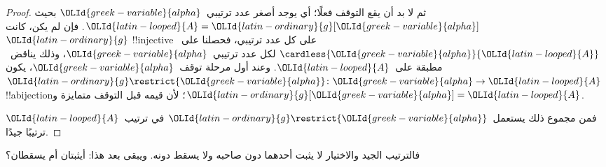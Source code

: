 \documentclass[../../../include/open-logic-section]{subfiles}
\begin{document}
\begin{proof}
ثم لا بد أن يقع التوقف فعلًا؛ أي يوجد أصغر عدد ترتيبي~${\OLId{greek-variable}{alpha}}$ بحيث
${\OLId{latin-looped}{A}} = {\OLId{latin-ordinary}{g}}[{\OLId{greek-variable}{alpha}}]$. فإن لم يكن، كانت~${\OLId{latin-ordinary}{g}}$ !!{injective} على كل عدد
ترتيبي، فحصلنا على~$\cardless{{\OLId{greek-variable}{alpha}}}{{\OLId{latin-looped}{A}}}$ لكل عدد ترتيبي~${\OLId{greek-variable}{alpha}}$،
وذلك يناقض~ مطبقة على~${\OLId{latin-looped}{A}}$. وعند أول
مرحلة توقف~${\OLId{greek-variable}{alpha}}$، يكون
${\OLId{latin-ordinary}{g}}\restrict{\OLId{greek-variable}{alpha}} \colon {\OLId{greek-variable}{alpha}} \to {\OLId{latin-looped}{A}}$ !!a{bijection}؛ لأن قيمه قبل
التوقف متمايزة و${\OLId{latin-ordinary}{g}}[{\OLId{greek-variable}{alpha}}] = {\OLId{latin-looped}{A}}$.

فمن مجموع ذلك يستعمل~${\OLId{latin-ordinary}{g}}\restrict{\OLId{greek-variable}{alpha}}$ في ترتيب~${\OLId{latin-looped}{A}}$ ترتيبًا جيدًا.
\end{proof}

فالترتيب الجيد والاختيار لا يثبت أحدهما دون صاحبه ولا يسقط دونه. ويبقى
بعد هذا: أيثبتان أم يسقطان؟
\end{document}

